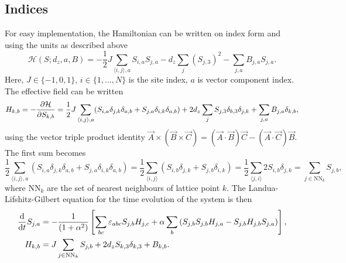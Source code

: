 \documentclass{article}
\begin{document}
    \subsection*{Indices}
    For easy implementation, the Hamiltonian can be written on index form and using the units as described above
    \begin{equation*}
        \mathcal{H}(S; d_z, a, B) = -\frac{1}{2} J \sum_{\langle i, j \rangle, a} S_{i, a} S_{j, a} - d_z \sum_{j} (S_{j,3})^2 -  \sum_{j, a} B_{j, a} S_{j,a}.
    \end{equation*}
    Here, $J\in\{-1, 0, 1\}$, $i\in\{1, ..., N\}$ is the site index, $a$ is vector component index. The effective field can be written
    \begin{align*}
        H_{k, b} = - \pdv{\mathcal{H}}{S_{k, b}} = \frac{1}{2} J \sum_{\langle i, j \rangle, a} (S_{i, a}\delta_{j,k}\delta_{a, b} + S_{j, a}\delta_{i,k}\delta_{a, b}) + 2 d_z \sum_{j} S_{j,3} \delta_{b, 3}\delta_{j, k} +  \sum_{j, a} B_{j, a} \delta_{k,b},
    \end{align*}
    using the vector triple product identity $\vec A \times (\vec B \times \vec C) = (\vec A \cdot \vec B) \vec C - (\vec A \cdot \vec C) \vec B$. The first sum becomes
    \begin{equation*}
        \frac{1}{2}\sum_{\langle i, j \rangle, a} (S_{i, a}\delta_{j,k}\delta_{a, b} + S_{j, a}\delta_{i,k}\delta_{a, b}) = \frac{1}{2}\sum_{\langle i, j \rangle} (S_{i, b}\delta_{j,k} + S_{j, b}\delta_{i,k}) = \frac{1}{2}\sum_{\langle j, i \rangle} 2S_{i, b} \delta_{j, k} = \sum_{j \in \mathrm{NN}_k} S_{j, b},
    \end{equation*}
    where $\mathrm{NN}_k$ are the set of nearest neighbours of lattice point $k$. The Landua-Lifshitz-Gilbert equation for the time evolution of the system is then
    \begin{align}
        \dv{t} S_{j, a} &= - \frac{1}{(1 + \alpha^2)}\left[\sum_{b c}\varepsilon_{abc}S_{j, b}H_{j,c} + \alpha \sum_{b}\left(S_{j, b}S_{j, b}H_{j, a} - S_{j, b}H_{j, b}S_{j, a}\right)\right], \label{LLG} \\
        H_{k, b} &= J\sum_{j \in \mathrm{NN}_k} S_{j, b} + 2d_z S_{k, 3} \delta_{k, 3} +  B_{k, b}. \label{effective field}
    \end{align}

    
\end{document}
